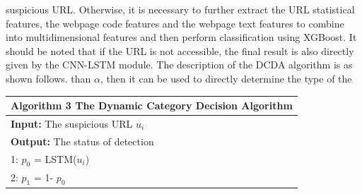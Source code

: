 \documentclass{ieeeaccess}
\begin{document}
suspicious URL. Otherwise, it is necessary to further extract
the URL statistical features, the webpage code features and
the webpage text features to combine into multidimensional
features and then perform classification using XGBoost.
It should be noted that if the URL is not accessible, the final
result is also directly given by the CNN-LSTM module. The
description of the DCDA algorithm is as shown follows.
than $\alpha$, then it can be used to directly determine the type of the
\begin{table}[htp]
\begin{tabular}{l}
\hline
\textbf{Algorithm 3} The Dynamic Category Decision Algorithm                                                                                                                                                                                                                         \\ \hline
\textbf{Input:} The suspicious URL $u_{i}$                                                                                           \\
\textbf{Output:} The status of detection                                                                                                                                                              \\
1: $p_{0}$ = LSTM($u_{i}$)                                                                                                                                                                              \\
    
2: $p_{1}$ = 1- $p_{0}$


\end{tabular}
\end{table}
\end{document}
